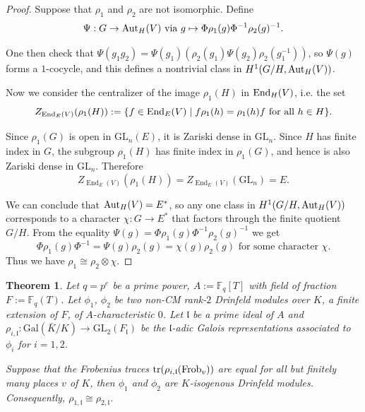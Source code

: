 \documentclass[20pt, oneside]{article}   	%
\newtheorem{thm}{Theorem}[section]
\theoremstyle{definition}
\newcommand{\F}{\mathbb{F}}
\newcommand{\fl}{\mathfrak{l}}
\newcommand{\Gal}{\mathrm{Gal}}
\newcommand{\GL}{\mathrm{GL}}
\begin{document}
\begin{proof}
Suppose that $\rho_1$ and $\rho_2$ are not isomorphic. Define $$\Psi:G\rightarrow {\rm Aut}_H(V)\textrm{ via } g\mapsto \Phi\rho_1(g)\Phi^{-1}\rho_2(g)^{-1}.$$

One then check that $\Psi(g_1g_2)=\Psi(g_1)\left( \rho_2(g_1)\Psi(g_2)\rho_2(g_1^{-1}) \right)$, so $\Psi(g)$ forms a $1$-cocycle, and this defines a nontrivial class in $H^1(G/H,{\rm Aut}_H(V))$. 

Now we consider the centralizer of the image  $\rho_1(H)$ in ${\rm End}_H(V)$, i.e. the set $$Z_{{\rm End}_E(V)}(\rho_1(H)):=\{f\in {\rm End}_E(V)\mid f\rho_1(h)=\rho_1(h)f \textrm{ for all }h\in H\}.$$


Since $\rho_1(G)$ is open in $\mathrm{GL}_n(E)$, it is Zariski dense in $\mathrm{GL}_n$. Since $H$ has finite index in $G$, the subgroup $\rho_1(H)$ has finite index in $\rho_1(G)$, and hence is also Zariski dense in $\mathrm{GL}_n$. Therefore
\[
Z_{\operatorname{End}_E(V)}(\rho_1(H))
=
Z_{\operatorname{End}_E(V)}(\mathrm{GL}_n)
=
E.
\]

 We can conclude that ${\rm Aut}_H(V)=E^*$, so any one class in $H^1(G/H,{\rm Aut}_H(V))$ corresponds to a character $\chi:G\rightarrow E^*$ that factors through the finite quotient $G/H$. From the equality $\Psi(g)=\Phi\rho_1(g)\Phi^{-1}\rho_2(g)^{-1}$ we get $$\Phi\rho_1(g)\Phi^{-1}=\Psi(g)\rho_2(g)=\chi(g)\rho_2(g) \textrm{ for some character $\chi$}.$$
 Thus we have $\rho_1\cong\rho_2\otimes\chi$.
 
\end{proof}





\begin{thm}\label{mainthm1}
Let $q=p^e$ be a prime power, $A:=\F_q[T]$ with field of fraction $F:=\F_q(T)$. Let $\phi_1$, $\phi_2$ be two non-CM rank-$2$ Drinfeld modules over $K$, a finite extension of $F$, of $A$-characteristic $0$. Let $\fl$ be a prime ideal of $A$ and $\rho_{i,\fl}:\Gal(\bar{K}/K)\rightarrow \GL_2(F_\fl)$  be the $\fl$-adic Galois representations associated to $\phi_i$ for $i=1,2$. 

Suppose that the Frobenius traces ${\rm{tr}}(\rho_{i,\fl}({\rm Frob}_{v}))$ are equal for all but finitely many places $v$ of $K$, then $\phi_1$ and $\phi_2$ are $K$-isogenous Drinfeld modules. Consequently, $\rho_{1,\fl}\cong\rho_{2,\fl}$.
\end{thm}
\end{document}
